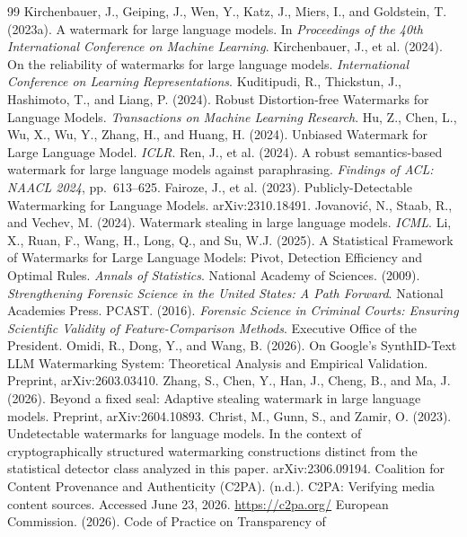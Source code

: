 \documentclass[11pt]{article}
\begin{document}
\begin{thebibliography}{99}
 Kirchenbauer, J., Geiping, J., Wen, Y., Katz, J., Miers, I., and
Goldstein, T. (2023a). A watermark for large language models. In \emph{Proceedings
of the 40th International Conference on Machine Learning}.
 Kirchenbauer, J., et al. (2024). On the reliability of watermarks
for large language models. \emph{International Conference on Learning
Representations}.
 Kuditipudi, R., Thickstun, J., Hashimoto, T., and Liang, P. (2024).
Robust Distortion-free Watermarks for Language Models. \emph{Transactions on
Machine Learning Research}.
 Hu, Z., Chen, L., Wu, X., Wu, Y., Zhang, H., and Huang, H. (2024).
Unbiased Watermark for Large Language Model. \emph{ICLR}.
 Ren, J., et al. (2024). A robust semantics-based watermark for large
language models against paraphrasing. \emph{Findings of ACL: NAACL 2024}, pp.\
613--625.
 Fairoze, J., et al. (2023). Publicly-Detectable Watermarking for
Language Models. arXiv:2310.18491.
 Jovanovi\'c, N., Staab, R., and Vechev, M. (2024). Watermark stealing
in large language models. \emph{ICML}.
 Li, X., Ruan, F., Wang, H., Long, Q., and Su, W.J. (2025). A
Statistical Framework of Watermarks for Large Language Models: Pivot, Detection
Efficiency and Optimal Rules. \emph{Annals of Statistics}.
 National Academy of Sciences. (2009). \emph{Strengthening Forensic
Science in the United States: A Path Forward}. National Academies Press.
\bibitem{pcast16} PCAST. (2016). \emph{Forensic Science in Criminal Courts: Ensuring
Scientific Validity of Feature-Comparison Methods}. Executive Office of the
President.
 Omidi, R., Dong, Y., and Wang, B. (2026). On Google's SynthID-Text
LLM Watermarking System: Theoretical Analysis and Empirical Validation. Preprint,
arXiv:2603.03410.
 Zhang, S., Chen, Y., Han, J., Cheng, B., and Ma, J. (2026). Beyond
a fixed seal: Adaptive stealing watermark in large language models. Preprint,
arXiv:2604.10893.
 Christ, M., Gunn, S., and Zamir, O. (2023). Undetectable watermarks
for language models. In the context of cryptographically structured watermarking
constructions distinct from the statistical detector class analyzed in this paper.
arXiv:2306.09194.
 Coalition for Content Provenance and Authenticity (C2PA). (n.d.).
C2PA: Verifying media content sources. Accessed June 23, 2026.
\url{https://c2pa.org/}
 European Commission. (2026). Code of Practice on Transparency of

\end{thebibliography}
\end{document}
